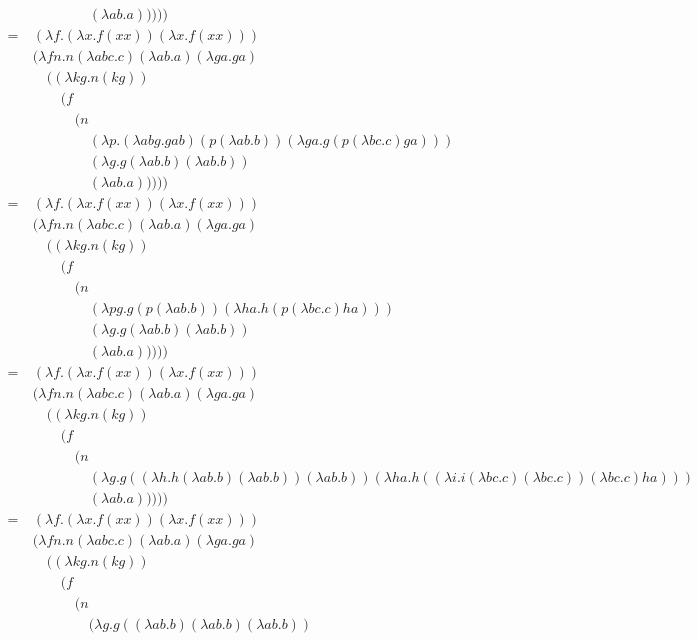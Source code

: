\documentclass[11pt]{article}
\begin{document}
\begin{align*}
	&\quad\quad\quad\quad(\lambda ab.a)))))\\
	=\ &(\lambda f.(\lambda x.f(xx))(\lambda x.f(xx)))\\
	&(\lambda fn.n(\lambda abc.c)(\lambda ab.a)(\lambda ga.ga)\\
	&\quad((\lambda kg.n(kg))\\
	&\quad\quad(f\\
	&\quad\quad\quad(n\\
	&\quad\quad\quad\quad(\lambda p.(\lambda abg.gab)(p(\lambda ab.b))(\lambda ga.g(p(\lambda bc.c)ga)))\\
	&\quad\quad\quad\quad(\lambda g.g(\lambda ab.b)(\lambda ab.b))\\
	&\quad\quad\quad\quad(\lambda ab.a)))))\\
	=\ &(\lambda f.(\lambda x.f(xx))(\lambda x.f(xx)))\\
	&(\lambda fn.n(\lambda abc.c)(\lambda ab.a)(\lambda ga.ga)\\
	&\quad((\lambda kg.n(kg))\\
	&\quad\quad(f\\
	&\quad\quad\quad(n\\
	&\quad\quad\quad\quad(\lambda pg.g(p(\lambda ab.b))(\lambda ha.h(p(\lambda bc.c)ha)))\\
	&\quad\quad\quad\quad(\lambda g.g(\lambda ab.b)(\lambda ab.b))\\
	&\quad\quad\quad\quad(\lambda ab.a)))))\\
	=\ &(\lambda f.(\lambda x.f(xx))(\lambda x.f(xx)))\\
	&(\lambda fn.n(\lambda abc.c)(\lambda ab.a)(\lambda ga.ga)\\
	&\quad((\lambda kg.n(kg))\\
	&\quad\quad(f\\
	&\quad\quad\quad(n\\
	&\quad\quad\quad\quad(\lambda g.g((\lambda h.h(\lambda ab.b)(\lambda ab.b))(\lambda ab.b))
		(\lambda ha.h((\lambda i.i(\lambda bc.c)(\lambda bc.c))(\lambda bc.c)ha)))\\
	&\quad\quad\quad\quad(\lambda ab.a)))))\\
	=\ &(\lambda f.(\lambda x.f(xx))(\lambda x.f(xx)))\\
	&(\lambda fn.n(\lambda abc.c)(\lambda ab.a)(\lambda ga.ga)\\
	&\quad((\lambda kg.n(kg))\\
	&\quad\quad(f\\
	&\quad\quad\quad(n\\
	&\quad\quad\quad\quad(\lambda g.g((\lambda ab.b)(\lambda ab.b)(\lambda ab.b))

\end{align*}
\end{document}
